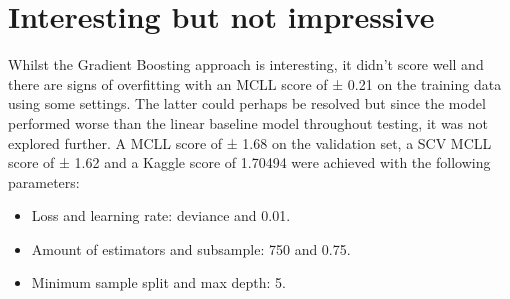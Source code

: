 
\section{Interesting but not impressive}
\label{section:gb_optimal}

Whilst the Gradient Boosting approach is interesting, it didn't score well and there are signs of overfitting with an MCLL score of ± 0.21 on the training data using some settings.
The latter could perhaps be resolved but since the model performed worse than the linear baseline model throughout testing, it was not explored further.
A MCLL score of ± 1.68 on the validation set, a SCV MCLL score of ± 1.62 and a Kaggle score of 1.70494 were achieved with the following parameters:
\begin{itemize}
    \item Loss and learning rate: deviance and 0.01.
    \item Amount of estimators and subsample: 750 and 0.75.
    \item Minimum sample split and max depth: 5.
\end{itemize}